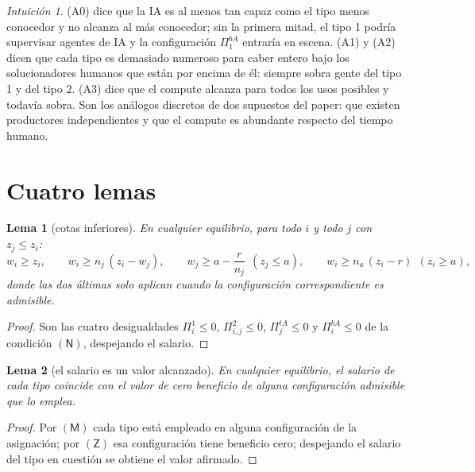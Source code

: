 \documentclass[11pt]{article}
\theoremstyle{plain}
\newtheorem{lema}{Lema}
\theoremstyle{definition}
\theoremstyle{remark}
\newtheorem*{intuicion}{Intuición}
\newcommand{\ai}{a}
\newcommand{\N}{\mathsf{N}}
\newcommand{\Z}{\mathsf{Z}}
\newcommand{\Mk}{\mathsf{M}}
\begin{document}
\begin{intuicion}
(A0) dice que la IA es al menos tan capaz como el tipo menos conocedor y no alcanza al más
conocedor; sin la primera mitad, el tipo 1 podría supervisar agentes de IA y la configuración
$\Pi^{bA}_{1}$ entraría en escena. (A1) y (A2) dicen que cada tipo es demasiado numeroso para caber entero bajo los solucionadores
humanos que están por encima de él: siempre sobra gente del tipo 1 y del tipo 2. (A3) dice que el
compute alcanza para todos los usos posibles y todavía sobra. Son los análogos discretos de dos
supuestos del paper: que existen productores independientes y que el compute es abundante respecto
del tiempo humano.
\end{intuicion}

\section{Cuatro lemas}

\begin{lema}[cotas inferiores]\label{lem:cotas}
En cualquier equilibrio, para todo $i$ y todo $j$ con $z_j\le z_i$:
\[
  w_i\ge z_i,\qquad w_i\ge n_j\,(z_i-w_j),\qquad
  w_j\ge \ai-\frac{r}{n_j}\ \ (z_j\le \ai),\qquad
  w_i\ge n_a\,(z_i-r)\ \ (z_i\ge \ai),
\]
donde las dos últimas solo aplican cuando la configuración correspondiente es admisible.
\end{lema}
\begin{proof}
Son las cuatro desigualdades $\Pi^{1}_i\le0$, $\Pi^{2}_{i,j}\le0$, $\Pi^{tA}_j\le0$ y
$\Pi^{bA}_i\le0$ de la condición $(\N)$, despejando el salario.
\end{proof}

\begin{lema}[el salario es un valor alcanzado]\label{lem:alcanzado}
En cualquier equilibrio, el salario de cada tipo coincide con el valor de cero beneficio de alguna
configuración admisible que lo emplea.
\end{lema}
\begin{proof}
Por $(\Mk)$ cada tipo está empleado en alguna configuración de la asignación; por $(\Z)$ esa
configuración tiene beneficio cero; despejando el salario del tipo en cuestión se obtiene el valor
afirmado.
\end{proof}
\end{document}
